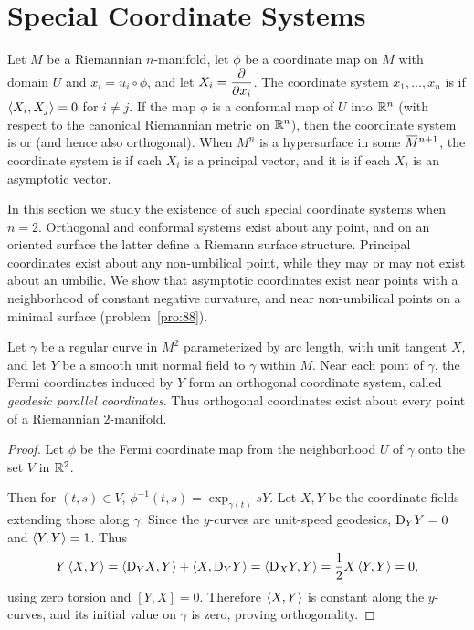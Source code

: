 \documentclass[../main]{subfiles}
\begin{document}
\section{Special Coordinate Systems}\label{ch09:s5}

Let $M$ be a Riemannian $n$-manifold, let $\phi$ be a coordinate map on $M$ with domain $U$ and $x_i = u_i \circ \phi$, and let $X_i = \dfrac{\partial }{\partial x_i}$. The coordinate system $x_1, \dots,x_n$ is  if $\left\langle X_i,X_j\right\rangle = 0$ for $i \ne j$. If the map $\phi$ is a conformal map of $U$ into $\mathbb{R}^n$ (with respect to the canonical Riemannian metric on $\mathbb{R}^n$), then the coordinate system is  or  (and hence also orthogonal). When $M^n$ is a hypersurface in some $\xoverline{M}^{n+1}$, the coordinate system is  if each $X_i$ is a principal vector, and it is  if each $X_i$ is an asymptotic vector.

In this section we study the existence of such special coordinate systems when $n=2$. Orthogonal and conformal systems exist about any point, and on an oriented surface the latter define a Riemann surface structure. Principal coordinates exist about any non-umbilical point, while they may or may not exist about an umbilic. We show that asymptotic coordinates exist near points with a neighborhood of constant negative curvature, and near non-umbilical points on a minimal surface (problem~\ref{pro:88}).



\begin{theorem}[Gauss 1827] \label{thm:ch9.5.1}
    Let $\gamma$ be a regular curve in $M^2$ parameterized by arc length, with unit tangent $X$, and let $Y$ be a smooth unit normal field to $\gamma$ within $M$. Near each point of $\gamma$, the Fermi coordinates induced by $Y$ form an orthogonal coordinate system, called \emph{geodesic parallel coordinates}. Thus orthogonal coordinates exist about every point of a Riemannian $2$-manifold.
\end{theorem}


\begin{proof}
    Let $\phi$ be the Fermi coordinate map from the neighborhood $U$ of $\gamma$ onto the set $V$ in $\mathbb{R}^2$.

    Then for $(t,s)\in V$, $\phi^{-1}(t,s)=\exp_{\gamma(t)}sY$. Let $X,Y$ be the coordinate fields extending those along $\gamma$. Since the $y$-curves are unit-speed geodesics, $\mathrm{D}_YY=0$ and $\left\langle Y,Y\right\rangle=1$. Thus \[Y\left\langle X,Y\right\rangle=\left\langle\mathrm{D}_YX,Y\right\rangle+\left\langle X,\mathrm{D}_YY\right\rangle=\left\langle\mathrm{D}_XY,Y\right\rangle=\frac12X\left\langle Y,Y\right\rangle=0,\] using zero torsion and $[Y,X]=0$. Therefore $\left\langle X,Y\right\rangle$ is constant along the $y$-curves, and its initial value on $\gamma$ is zero, proving orthogonality.
\end{proof}
\end{document}

